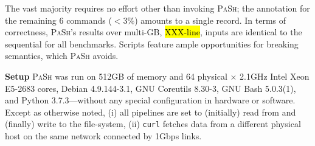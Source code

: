 \documentclass[sigplan, review, screen, anonymous]{acmart}
\newcommand{\ie}{{\em i.e.}, }
\newcommand{\heading}[1]{\vspace{4pt}\noindent\textbf{#1}\enspace}
\newcommand{\ttt}[1]{\texttt{#1}}
\newcommand{\todo}[1]{\hl{#1}\xspace}
\newcommand{\kk}[1]{[{\color{magenta}kk: #1}]}
\newcommand{\sys}{{\scshape PaSh}\xspace}
\begin{document}
The vast majority requires no effort other than invoking \sys;
  the annotation for the remaining 6 commands ($<3\%$) amounts to a single record.
% 
In terms of correctness, \sys's results over multi-GB, \todo{XXX-line}, inputs are identical to the sequential for all benchmarks.
Scripts feature ample opportunities for breaking semantics, which \sys avoids.




\heading{Setup}
\sys was run on 512GB of memory and 64 physical $\times$ 2.1GHz Intel Xeon E5-2683 cores, Debian 4.9.144-3.1, GNU Coreutils 8.30-3, GNU Bash 5.0.3(1), and Python 3.7.3---without any special configuration in hardware or software.
Except as otherwise noted,
  (i) all pipelines are set to (initially) read from and (finally) write to the file-system,
  (ii) \ttt{curl} fetches data from a different physical host on the same network connected by 1Gbps links.
\end{document}
